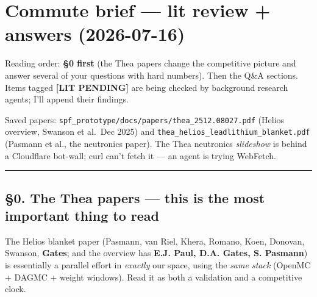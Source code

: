 \documentclass[
]{article}
\author{}
\date{}
\begin{document}
\section{Commute brief --- lit review + answers
(2026-07-16)}\label{commute-brief-lit-review-answers-2026-07-16}

Reading order: \textbf{§0 first} (the Thea papers change the competitive
picture and answer several of your questions with hard numbers). Then
the Q\&A sections. Items tagged \textbf{{[}LIT PENDING{]}} are being
checked by background research agents; I'll append their findings.

Saved papers: \texttt{spf\_prototype/docs/papers/thea\_2512.08027.pdf}
(Helios overview, Swanson et al.~Dec 2025) and
\texttt{thea\_helios\_leadlithium\_blanket.pdf} (Pasmann et al., the
neutronics paper). The Thea neutronics \emph{slideshow} is behind a
Cloudflare bot-wall; curl can't fetch it --- an agent is trying
WebFetch.

\begin{center}\rule{0.5\linewidth}{0.5pt}\end{center}

\subsection{§0. The Thea papers --- this is the most important thing to
read}\label{the-thea-papers-this-is-the-most-important-thing-to-read}

The Helios blanket paper (Pasmann, van Riel, Khera, Romano, Koen,
Donovan, Swanson, \textbf{Gates}; and the overview has \textbf{E.J.
Paul, D.A. Gates, S. Pasmann}) is essentially a parallel effort in
\emph{exactly} our space, using the \emph{same stack} (OpenMC + DAGMC +
weight windows). Read it as both a validation and a competitive clock.
\end{document}
